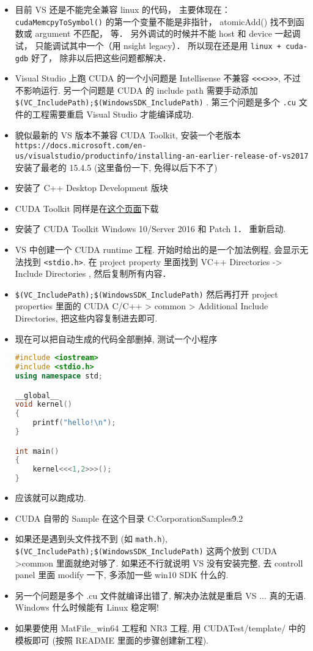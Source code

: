
\begin{itemize}
\item 目前 VS 还是不能完全兼容 linux 的代码， 主要体现在： \verb|cudaMemcpyToSymbol()| 的第一个变量不能是非指针， atomicAdd() 找不到函数或 argument 不匹配， 等． 另外调试的时候并不能 host 和 device 一起调试， 只能调试其中一个（用 nsight legacy）． 所以现在还是用 \verb|linux + cuda-gdb| 好了， 除非以后把这些问题都解决．
\item Visual Studio 上跑 CUDA 的一个小问题是 Intellisense 不兼容 \verb`<<<>>>`, 不过不影响运行. 另一个问题是 CUDA 的 include path 需要手动添加 \verb`$(VC_IncludePath);$(WindowsSDK_IncludePath)` . 第三个问题是多个 \verb`.cu` 文件的工程需要重启 Visual Studio 才能编译成功.
\item 貌似最新的 VS 版本不兼容 CUDA Toolkit, 安装一个老版本 \verb|https://docs.microsoft.com/en-us/visualstudio/productinfo/installing-an-earlier-release-of-vs2017| 安装了最老的 15.4.5 (这里备份一下, 免得以后下不了)
\item 安装了 C++ Desktop Development 版块
\item CUDA Toolkit 同样是在\href{https://developer.nvidia.com/cuda-downloads}{这个页面}下载
\item 安装了 CUDA Toolkit Windows 10/Server 2016 和 Patch 1． 重新启动.
\item VS 中创建一个 CUDA runtime 工程. 开始时给出的是一个加法例程, 会显示无法找到 \verb`<stdio.h>`. 在 project property 里面找到 VC++ Directories -> Include Directories , 然后复制所有内容．
\item \verb|$(VC_IncludePath);$(WindowsSDK_IncludePath)| 然后再打开 project properties 里面的 CUDA C/C++ >  common > Additional Include Directories, 把这些内容复制进去即可.
\item 现在可以把自动生成的代码全部删掉, 测试一个小程序
\begin{lstlisting}[language=cpp]
#include <iostream>
#include <stdio.h>
using namespace std;

__global__
void kernel()
{
	printf("hello!\n");
}

int main()
{
	kernel<<<1,2>>>();
}
\end{lstlisting}
\item 应该就可以跑成功.
\item CUDA 自带的 Sample 在这个目录 C:\ProgramData\NVIDIA Corporation\CUDA Samples\v9.2
\item 如果还是遇到头文件找不到 (如 \verb`math.h`), \verb`$(VC_IncludePath);$(WindowsSDK_IncludePath)` 这两个放到 CUDA >common 里面就绝对够了. 如果还不行就说明 VS 没有安装完整, 去 controll panel 里面 modify 一下, 多添加一些 win10 SDK 什么的.
\item 另一个问题是多个 .cu 文件就编译出错了, 解决办法就是重启 VS ... 真的无语. Windows 什么时候能有 Linux 稳定啊!
\item 如果要使用 MatFile_win64 工程和 NR3 工程, 用 CUDATest/template/ 中的模板即可 (按照 README 里面的步骤创建新工程).
\end{itemize}
